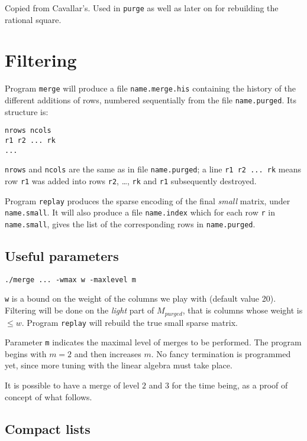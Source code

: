 \documentclass{article}
\begin{document}
Copied from Cavallar's. Used in \verb+purge+ as well as later on for
rebuilding the rational square.

\section{Filtering}

Program \verb+merge+
will produce a file \verb+name.merge.his+ containing the history of
the different additions of rows, numbered sequentially from the file
\verb+name.purged+. Its structure is:
\begin{verbatim}
nrows ncols
r1 r2 ... rk
...
\end{verbatim}
\verb+nrows+ and \verb+ncols+ are the same as in file \verb+name.purged+;
a line \verb+r1 r2 ... rk+ means row \verb+r1+ was added into rows
\verb+r2+, \ldots, \verb+rk+ and \verb+r1+ subsequently destroyed.

Program \verb+replay+ produces the sparse encoding of the final {\em
small} matrix, under \verb+name.small+. It will also produce a file
\verb+name.index+ which for each row \verb+r+ in \verb+name.small+,
gives the list of the corresponding rows in \verb+name.purged+.

\subsection{Useful parameters}

\begin{verbatim}
./merge ... -wmax w -maxlevel m
\end{verbatim}
\verb+w+ is a bound on the weight of the columns we play
with (default value 20). Filtering will be done on the {\em light}
part of $M_{purged}$, that is columns whose weight is $\leq
w$. Program \verb+replay+ will rebuild the true small sparse matrix.

Parameter \verb+m+ indicates the maximal level of merges to be
performed. The program begins with $m=2$ and then increases $m$. No
fancy termination is programmed yet, since more tuning with the linear
algebra must take place.

It is possible to have a merge of level $2$ and $3$ for the time
being, as a proof of concept of what follows.

\subsection{Compact lists}
\end{document}
